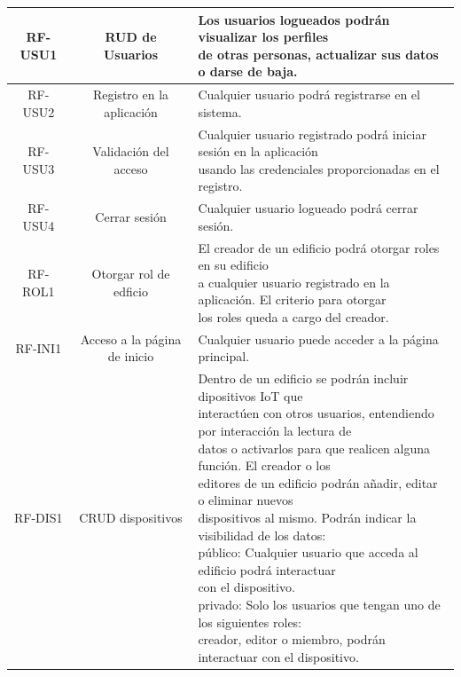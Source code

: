 \documentclass[12pt, a4paper, twoside]{article}
\begin{document}
\begin{table}
\begin{tabular}{ |c|c|l| }
  RF-USU1 & RUD de Usuarios 
  & \makecell[l]{Los usuarios logueados podrán visualizar los perfiles \\
  de otras personas, actualizar sus datos o darse de baja. 
  }\\ \hline
  RF-USU2 & Registro en la aplicación 
  & Cualquier usuario podrá registrarse en el sistema. 
  \\ \hline 
  RF-USU3 & Validación del acceso 
  & \makecell[l]{Cualquier usuario registrado podrá iniciar sesión en la aplicación\\
  usando las credenciales proporcionadas en el registro.
   } \\ \hline
  RF-USU4 & Cerrar sesión & Cualquier usuario logueado podrá cerrar sesión. \\ \hline


  RF-ROL1 & Otorgar rol de edficio 
  & \makecell[l]{El creador de un edificio podrá otorgar roles en su edificio \\
  a cualquier usuario registrado en la aplicación. El criterio para otorgar \\
  los roles queda a cargo del creador.
  } \\ \hline
 
  RF-INI1 & Acceso a la página de inicio & Cualquier usuario puede acceder a la página principal. \\ \hline
 
  RF-DIS1 & CRUD dispositivos 
  & \makecell[l]{Dentro de un edificio se podrán incluir dipositivos IoT que \\
    interactúen con otros usuarios, entendiendo por interacción la lectura de \\
    datos o activarlos para que realicen alguna función. El creador o los \\
    editores de un edificio podrán añadir, editar o eliminar nuevos \\
    dispositivos al mismo. Podrán indicar la visibilidad de los datos: \\
    público: Cualquier usuario que acceda al edificio podrá interactuar \\
    con el dispositivo. \\
    privado: Solo los usuarios que tengan uno de los siguientes roles: \\
    creador, editor o miembro, podrán interactuar con el dispositivo.
  } \\ \hline
  \end{tabular}
\end{table}
\end{document}
